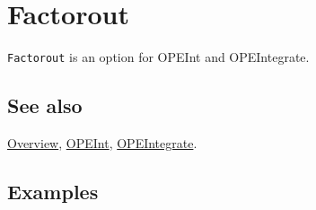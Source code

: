 \documentclass[../FeynCalcManual.tex]{subfiles}
\begin{document}
\hypertarget{factorout}{
\section{Factorout}\label{factorout}}

\texttt{Factorout} is an option for OPEInt and OPEIntegrate.

\subsection{See also}

\hyperlink{toc}{Overview}, \hyperlink{opeint}{OPEInt},
\hyperlink{opeintegrate}{OPEIntegrate}.

\subsection{Examples}
\end{document}
